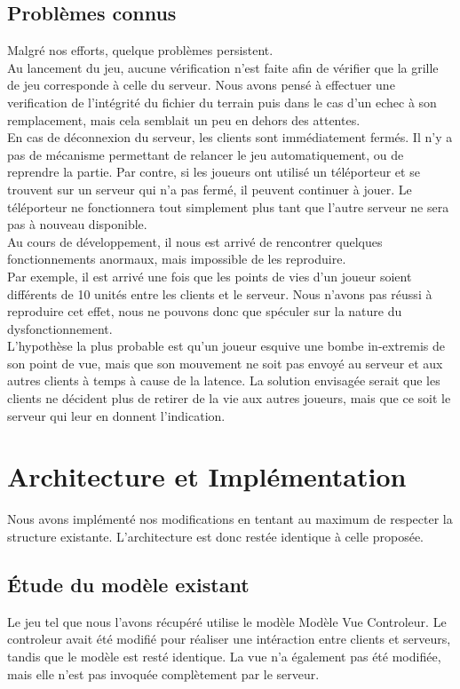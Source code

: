 \documentclass[12pt]{article}
\begin{document}
\subsection{Problèmes connus}
Malgré nos efforts, quelque problèmes persistent.\\
Au lancement du jeu, aucune vérification n'est faite afin de vérifier que la grille de jeu corresponde à celle du serveur. Nous avons pensé à effectuer une verification de l'intégrité du fichier du terrain puis dans le cas d'un echec à son remplacement, mais cela semblait un peu en dehors des attentes.
\\

En cas de déconnexion du serveur, les clients sont immédiatement fermés. Il n'y a pas de mécanisme permettant de relancer le jeu automatiquement, ou de reprendre la partie.
Par contre, si les joueurs ont utilisé un téléporteur et se trouvent sur un serveur qui n'a pas fermé, il peuvent continuer à jouer. Le téléporteur ne fonctionnera tout simplement plus tant que l'autre serveur ne sera pas à nouveau disponible.
\\

Au cours de développement, il nous est arrivé de rencontrer quelques fonctionnements anormaux, mais impossible de les reproduire.\\
Par exemple, il est arrivé une fois que les points de vies d'un joueur soient différents de 10 unités entre les clients et le serveur. Nous n'avons pas réussi à reproduire cet effet, nous ne pouvons donc que spéculer sur la nature du dysfonctionnement. \\

L'hypothèse la plus probable est qu'un joueur esquive une bombe in-extremis de son point de vue, mais que son mouvement ne soit pas envoyé au serveur et aux autres clients à temps à cause de la latence.
La solution envisagée serait que les clients ne décident plus de retirer de la vie aux autres joueurs, mais que ce soit le serveur qui leur en donnent l'indication.
\newpage

\section{Architecture et Implémentation}
Nous avons implémenté nos modifications en tentant au maximum de respecter la structure existante. L'architecture est donc restée identique à celle proposée.

\subsection{Étude du modèle existant}
Le jeu tel que nous l'avons récupéré utilise le modèle Modèle Vue Controleur. Le controleur avait été modifié pour réaliser une intéraction entre clients et serveurs, tandis que le modèle est resté identique. La vue n'a également pas été modifiée, mais elle n'est pas invoquée complètement par le serveur.
\\
\end{document}
